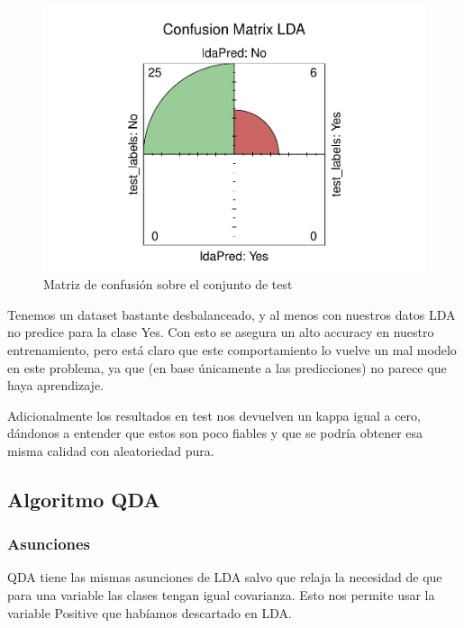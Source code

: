 \begin{figure}[H]\center\includegraphics[width=.9\linewidth]{img/Clasificacion_files/figure-latex/unnamed-chunk-21-1}\caption{Matriz de confusión sobre el conjunto de test}\end{figure}

Tenemos un dataset bastante desbalanceado, y al menos con nuestros datos LDA no predice para la clase Yes. Con esto se asegura un alto accuracy en nuestro entrenamiento, pero está claro que este comportamiento lo vuelve un mal modelo en este problema, ya que (en base únicamente a las predicciones) no parece que haya aprendizaje.

\vspace{\baselineskip}

Adicionalmente los resultados en test nos devuelven un kappa igual a cero, dándonos a entender que estos son poco fiables y que se podría obtener esa misma calidad con aleatoriedad pura.

\newpage

\subsection{Algoritmo QDA}
\subsubsection{Asunciones}

QDA tiene las mismas asunciones de LDA salvo que relaja la necesidad de que para una variable las clases tengan igual covarianza. Esto nos permite usar la variable Positive que habíamos descartado en LDA.

\vspace{\baselineskip}

